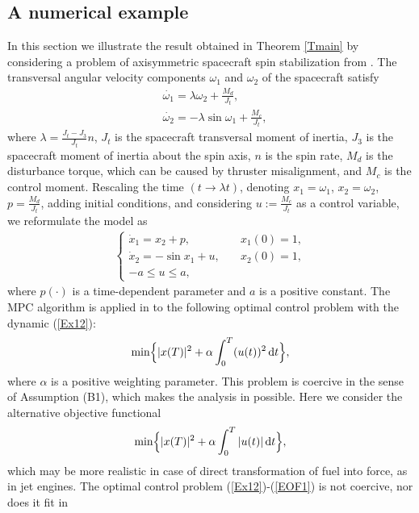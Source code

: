 \documentclass[11pt]{article}
\newcommand{\bd}{\begin{displaymath}}
\newcommand{\ed}{\end{displaymath}}
\newcommand{\be}{\begin{equation}}
\newcommand{\ee}{\end{equation}}
\newcommand{\al}{\alpha}
\newcommand{\dd}{\mbox{\rm\,d}}
\begin{document}
\subsection{A numerical example}
In this section we illustrate the result obtained in Theorem \ref{Tmain} by considering a problem 
of axisymmetric spacecraft spin stabilization from \cite[p. 353]{Wie-98}. 
The transversal angular velocity components $\omega_1$ and $\omega_2$ of the spacecraft satisfy
\begin{equation*}
\begin{aligned}
      &\dot{\omega_1} = \lambda \omega_2 + \frac{M_d}{J_t}, \\
      &\dot{\omega_2} = -\lambda \sin\omega_1 + \frac{M_c}{J_t},
\end{aligned}
\end{equation*}
where $\lambda = \frac{J_t - J_3}{J_t}n$, $J_t$ is the spacecraft transversal moment of inertia, 
$J_3$ is the spacecraft moment of inertia about the spin axis, $n$ is the spin rate, 
$M_d$ is the disturbance torque, which can be caused by thruster misalignment, 
and $M_c$ is the control moment. Rescaling the time $(t \rightarrow \lambda t)$, denoting 
$x_1 = \omega_1$, $x_2 = \omega_2$, $p =\frac{M_d}{J_t}$, 
adding initial conditions, and considering $u := \frac{M_{c}}{J_t}$ as a control variable, 
we reformulate the model as
\begin{align}\label{Ex12}
 \left\{ \begin{array}{ll}
     \dot{x}_1 = x_2 + p, \quad & x_1(0) = 1,\\
     \dot{x}_2 = -\sin x_1 + u,  \quad  & x_2(0) = 1,\\
       -a \leq u \leq a,
\end{array}
\right.
\end{align}
where $p(\cdot)$ is a time-dependent parameter and $a$ is a positive constant.
The MPC algorithm is applied in \cite{AD+IK+MK+VV+PV-20} to the following optimal control problem 
with the dynamic (\ref{Ex12}):
\bd
              \text{min} \Big\{ |x(T)|^2 + \alpha \int_0^T (u(t))^2 \dd t \Big\},  
\ed
where $\al$ is a positive weighting parameter. 
This problem is coercive in the sense of Assumption (B1), which makes the analysis in  
\cite{AD+IK+MK+VV+PV-20} possible. Here we consider the alternative objective functional 
\be\label{EOF1}
       \text{min} \Big\{ |x(T)|^2 + \alpha \int_0^T |u(t)| \dd t \Big\},
\ee
which may be more realistic in case of direct transformation of fuel into force, as in jet engines. 
The optimal control problem (\ref{Ex12})-(\ref{EOF1}) is not coercive, nor does it fit in
\end{document}
